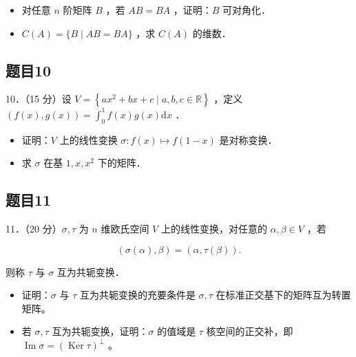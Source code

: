 \documentclass{article}
\begin{document}
\begin{itemize}
  \item[（1）] 对任意 \(n\) 阶矩阵 \(B\) ，若 \(A B=B A\) ，证明：\(B\) 可对角化．
  \item[（2）] \(C(A)=\{B \mid A B=B A\}\) ，求 \(C(A)\) 的维数．
\end{itemize}

\subsection{题目10}
10．（15 分）设 \(V=\left\{a x^{2}+b x+c \mid a, b, c \in \mathbb{R}\right\}\) ，定义 \((f(x), g(x))=\int_{0}^{1} f(x) g(x) \mathrm{d} x\) ．

\begin{itemize}
  \item[（1）] 证明：\(V\) 上的线性变换 \(\sigma: f(x) \mapsto f(1-x)\) 是对称变换．
  \item[（2）] 求 \(\sigma\) 在基 \(1, x, x^{2}\) 下的矩阵．
\end{itemize}

\subsection{题目11}
11．（20 分）\(\sigma, \tau\) 为 \(n\) 维欧氏空间 \(V\) 上的线性变换，对任意的 \(\alpha, \beta \in V\) ，若

\[
(\sigma(\alpha), \beta)=(\alpha, \tau(\beta)) .
\]

则称 \(\tau\) 与 \(\sigma\) 互为共轭变换．

\begin{itemize}
  \item[（1）] 证明：\(\sigma\) 与 \(\tau\) 互为共轭变换的充要条件是 \(\sigma, \tau\) 在标准正交基下的矩阵互为转置矩阵。
  \item[（2）] 若 \(\sigma, \tau\) 互为共轭变换，证明：\(\sigma\) 的值域是 \(\tau\) 核空间的正交补，即 \(\operatorname{Im} \sigma=(\operatorname{Ker} \tau)^{\perp}\) 。
\end{itemize}
\end{document}
